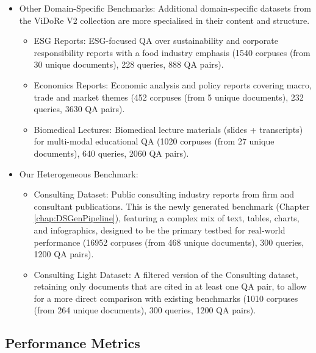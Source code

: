 \documentclass[12pt,twoside]{report}
\begin{document}
\begin{itemize}
\begin{itemize}
\item{SciDocs}: Scientific document retrieval and citation-oriented recommendation over scholarly publications (1000 corpuses, 217 queries, 1069 QA pairs).
\end{itemize}

\item{Other Domain-Specific Benchmarks}:
Additional domain-specific datasets from the ViDoRe V2 collection\cite{VidoreBenchmark} are more specialised in their content and structure.

\begin{itemize}
\item{ESG Reports}: ESG-focused QA over sustainability and corporate responsibility reports with a food industry emphasis (1540 corpuses (from 30 unique documents), 228 queries, 888 QA pairs).

\item{Economics Reports}: Economic analysis and policy reports covering macro, trade and market themes (452 corpuses (from 5 unique documents), 232 queries, 3630 QA pairs).

\item{Biomedical Lectures}: Biomedical lecture materials (slides + transcripts) for multi-modal educational QA (1020 corpuses (from 27 unique documents), 640 queries, 2060 QA pairs).
\end{itemize}

\item{Our Heterogeneous Benchmark}:
\begin{itemize}
\item{Consulting Dataset}: Public consulting industry reports from firm and consultant publications. This is the newly generated benchmark (Chapter \ref{chap:DSGenPipeline}), featuring a complex mix of text, tables, charts, and infographics, designed to be the primary testbed for real-world performance (16952 corpuses (from 468 unique documents), 300 queries, 1200 QA pairs).

\item{Consulting Light Dataset}: A filtered version of the Consulting dataset, retaining only documents that are cited in at least one QA pair, to allow for a more direct comparison with existing benchmarks (1010 corpuses (from 264 unique documents), 300 queries, 1200 QA pairs).
\end{itemize}
\end{itemize}

\subsection{Performance Metrics}
\end{document}
